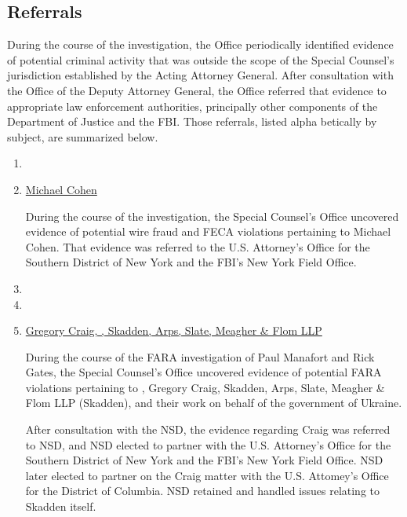 \subsection{Referrals}

During the course of the investigation, the Office periodically identified evidence of potential criminal activity that was outside the scope of the Special Counsel’s jurisdiction established by the Acting Attorney General.
After consultation with the Office of the Deputy Attorney General, the Office referred that evidence to appropriate law enforcement authorities, principally other components of the Department of Justice and the FBI.
Those referrals, listed alpha betically by subject, are summarized below.

\begin{enumerate}[1.]

    \item {}


    \item \underline{Michael Cohen}

During the course of the investigation, the Special Counsel’s Office uncovered evidence of potential wire fraud and FECA violations pertaining to Michael Cohen.
That evidence was referred to the U.S. Attorney’s Office for the Southern District of New York and the FBI’s New York Field Office.

    \item {}


    \item {}


    \item \underline{Gregory Craig, ,  Skadden, Arps, Slate, Meagher \& Flom LLP}

During the course of the FARA investigation of Paul Manafort and Rick Gates, the Special Counsel’s Office uncovered evidence of potential FARA violations pertaining to , Gregory Craig, Skadden, Arps, Slate, Meagher \& Flom LLP (Skadden), and their work on behalf of the government of Ukraine.

After consultation with the NSD, the evidence regarding Craig  was referred to NSD, and NSD elected to partner with the U.S. Attorney’s Office for the Southern District of New York and the FBI’s New York Field Office.
NSD later elected to partner on the Craig matter with the U.S. Attomey’s Office for the District of Columbia.
NSD retained and handled issues relating to Skadden itself.


\end{enumerate}
